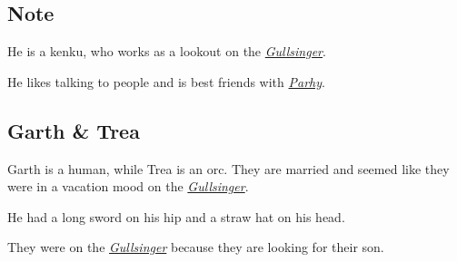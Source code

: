 \documentclass{article}
\begin{document}
\begin{multicols}{2}
    \subsection{Note}
    \label{note}

    He is a kenku, who works as a lookout on the \hyperref[gullsinger]{\textit{Gullsinger}}.

    He likes talking to people and is best friends with \hyperref[parhy]{\textit{Parhy}}.

    \subsection{Garth \& Trea}
    \label{garth_trea}

    Garth is a human, while Trea is an orc. They are married and seemed like they were in a vacation mood on the \hyperref[gullsinger]{\textit{Gullsinger}}.

    He had a long sword on his hip and a straw hat on his head.

    They were on the \hyperref[gullsinger]{\textit{Gullsinger}} because they are looking for their son.


\end{multicols}
\end{document}
